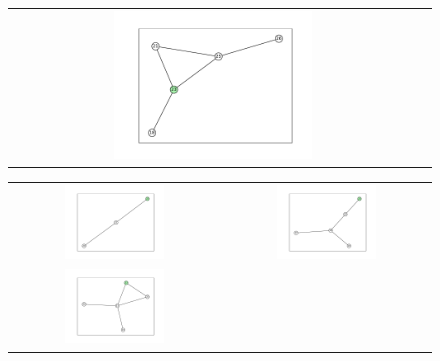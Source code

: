 \documentclass[12pt, a4paper]{extarticle}
\begin{document}
\begin{figure}[h!]
\begin{tabularx}{\textwidth}{cc}
\includegraphics[width=0.5\textwidth]{task11-graphlets/5_21-18-25-23-26.pdf} \\
\end{tabularx}\end{figure}
\begin{figure}\centering\begin{tabularx}{\textwidth}{cc}
\includegraphics[width=0.5\textwidth]{task11-graphlets/3_21-20-23.pdf} &
\includegraphics[width=0.5\textwidth]{task11-graphlets/5_10-16-17-25-23.pdf} \\
\includegraphics[width=0.5\textwidth]{task11-graphlets/5_14-21-25-22-23.pdf} &

\end{tabularx}
\end{figure}
\end{document}
